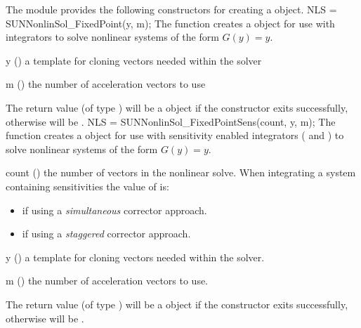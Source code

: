 The {\sunnonlinsolfixedpoint} module provides the following constructors
for creating a \newline
{} object.
{
  NLS = SUNNonlinSol\_FixedPoint(y, m);
}
{
  The function  creates a
   object for use with {\sundials} integrators to
  solve nonlinear systems of the form $G(y) = y$.
}
{
  \begin{args}[y]
  \item[y] ()
    a template for cloning vectors needed within the solver
  \item[m] ()
    the number of acceleration vectors to use
  \end{args}
}
{
  The return value  (of type ) will be
  a {\sunnonlinsol} object if the constructor exits successfully,
  otherwise  will be .
}
{}
{
  NLS = SUNNonlinSol\_FixedPointSens(count, y, m);
}
{
  The function  creates a
   object for use with {\sundials} sensitivity enabled
  integrators ({\cvodes} and {\idas}) to solve nonlinear systems of the form
  $G(y) = y$.
}
{
  \begin{args}[count]
  \item[count] ()
    the number of vectors in the nonlinear solve. When integrating a system
    containing  sensitivities the value of  is:
    \begin{itemize}
      \item {} if using a \textit{simultaneous} corrector approach.
      \item {} if using a \textit{staggered} corrector approach.
    \end{itemize}
  \item[y] ()
    a template for cloning vectors needed within the solver.
  \item[m] ()
    the number of acceleration vectors to use.
  \end{args}
}
{
  The return value  (of type ) will be
  a {\sunnonlinsol} object if the constructor exits successfully,
  otherwise  will be .
}
{}
